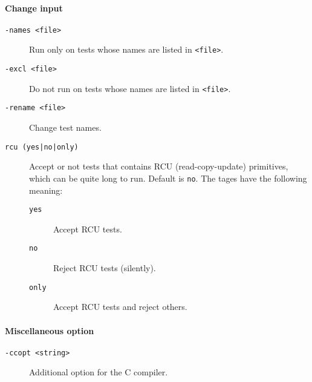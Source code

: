 \paragraph*{Change input}
\begin{description}
\item[{\tt -names <file>}] Run \litmus{} only on tests whose names are
listed in \texttt{<file>}.
\item[{\tt -excl <file>}] Do not run \litmus{} on tests whose names are
listed in \texttt{<file>}.
\item[{\tt -rename <file>}] Change test names.
\item[{\tt rcu (yes|no|only)}]
Accept or not tests that contains RCU (read-copy-update) primitives,
which can be quite long to run. Default is \texttt{no}.
The tages have the following meaning:
\begin{description}
\item[{\tt yes}] Accept RCU tests.
\item[{\tt no}] Reject  RCU tests (silently).
\item[{\tt only}] Accept RCU tests and reject others.
\end{description}
\end{description}

\paragraph*{Miscellaneous option}
\begin{description}
\item[{\tt -ccopt <string>}]Additional option for the C compiler.
\end{description}
